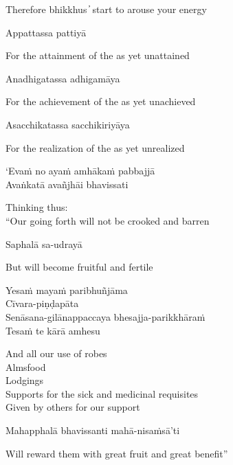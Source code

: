 \begin{cprenglish}
Therefore bhikkhus  ̓  start to arouse your energy
\end{cprenglish}

Appattassa pattiyā

\begin{cprenglish}
For the attainment of the as yet unattained
\end{cprenglish}

Anadhigatassa adhigamāya

\begin{cprenglish}
For the achievement of the as yet unachieved
\end{cprenglish}

Asacchikatassa sacchikiriyāya

\begin{cprenglish}
For the realization of the as yet unrealized
\end{cprenglish}

‘Evaṁ no ayaṁ amhākaṁ pabbajjā\\
Avaṅkatā avañjhāi bhavissati

\begin{cprenglish}
Thinking thus:\\
“Our going forth will not be crooked and barren
\end{cprenglish}

Saphalā sa-udrayā

\begin{cprenglish}
But will become fruitful and fertile
\end{cprenglish}

Yesaṁ mayaṁ paribhuñjāma\\
Cīvara-piṇḍapāta\\
Senāsana-gilānappaccaya bhesajja-parikkhāraṁ\\
Tesaṁ te kārā amhesu

\begin{cprenglish}
And all our use of robes\\
Almsfood\\
Lodgings\\
Supports for the sick and medicinal requisites\\
Given by others for our support
\end{cprenglish}

Mahapphalā bhavissanti mahā-nisaṁsā'ti

\begin{cprenglish}
Will reward them with great fruit and great benefit”
\end{cprenglish}

